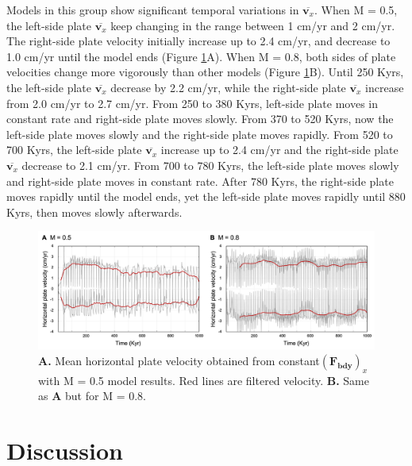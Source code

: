 \documentclass[letterpaper,12pt,notitle]{memphisthesis}                     %
\begin{document}
Models in this group show significant temporal variations in $\overline{\boldsymbol{v}_x}$. 
When M = 0.5, the left-side plate $\overline{\boldsymbol{v}_x}$ keep changing in the range between 1 cm/yr and 2 cm/yr. The right-side plate velocity initially increase up to 2.4 cm/yr, and decrease to 1.0 cm/yr until the model ends (Figure \ref{fig:fbmhv}A).
When M = 0.8, both sides of plate velocities change more vigorously than other models (Figure \ref{fig:fbmhv}B). Until 250 Kyrs, the left-side plate $\overline{\boldsymbol{v}_x}$ decrease by 2.2 cm/yr, while the right-side plate  $\overline{\boldsymbol{v}_x}$ increase from 2.0 cm/yr to 2.7 cm/yr. From 250 to 380 Kyrs, left-side plate moves in constant rate and right-side plate moves slowly. From 370 to 520 Kyrs, now the left-side plate moves slowly and the right-side plate moves rapidly. From 520 to 700 Kyrs, the left-side plate $\overline{\boldsymbol{v}_x}$ increase up to 2.4 cm/yr and the right-side plate $\overline{\boldsymbol{v}_x}$ decrease to 2.1 cm/yr. From 700 to 780 Kyrs, the left-side plate moves slowly and right-side plate moves in constant rate. After 780 Kyrs, the right-side plate moves rapidly until the model ends, yet the left-side plate moves rapidly until 880 Kyrs, then moves slowly afterwards.
%
\begin{figure}[!htb]
	\centering
	\includegraphics[width=0.98\linewidth,trim=4 4 4 4,clip]{./figs/fbmhv.png}
	\caption{\textbf{A.} Mean horizontal plate velocity obtained from constant$(\boldsymbol{F_{bdy}})_x$ with M = 0.5 model results. Red lines are filtered velocity. \textbf{B.} Same as \textbf{A} but for M = 0.8. }
	\label{fig:fbmhv}
\end{figure}

\chapter{Discussion}
\end{document}
